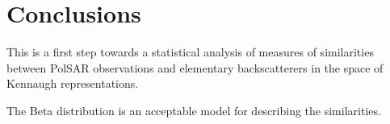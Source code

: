 \documentclass[conference]{IEEEtran}
\begin{document}
\section{Conclusions}

This is a first step towards a statistical analysis of measures of similarities between PolSAR observations and elementary backscatterers in the space of Kennaugh representations.

The Beta distribution is an acceptable model for describing the similarities.

%
%
%



\end{document}
